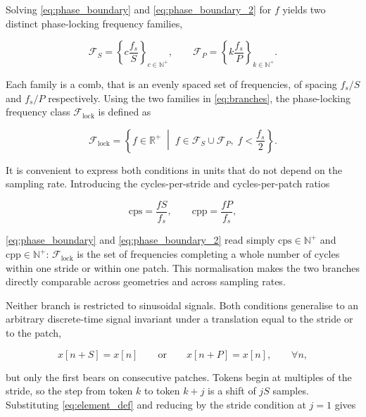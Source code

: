 Solving \autoref{eq:phase_boundary} and \autoref{eq:phase_boundary_2} for $f$ yields two distinct phase-locking frequency families,

\begin{equation}
\label{eq:branches}
\mathcal{F}_{S}
=
\left\{
c\frac{f_s}{S}
\right\}_{c\in\mathbb{N}^{+}},
\qquad
\mathcal{F}_{P}
=
\left\{
k\frac{f_s}{P}
\right\}_{k\in\mathbb{N}^{+}}.
\end{equation}

Each family is a comb, that is an evenly spaced set of frequencies, of spacing $f_s/S$ and $f_s/P$ respectively. Using the two families in \autoref{eq:branches}, the phase-locking frequency class $\mathcal{F}_{\mathrm{lock}}$ is defined as

\begin{equation}
\label{eq:flock_set}
\mathcal F_{\mathrm{lock}}
=
\left\{
f\in\mathbb{R}^{+}
\;\middle|\;
f\in\mathcal{F}_{S}\cup\mathcal{F}_{P},
\;
f<\frac{f_s}{2}
\right\}.
\end{equation}

It is convenient to express both conditions in units that do not depend on the sampling rate. Introducing the cycles-per-stride and cycles-per-patch ratios

\begin{equation}
\label{eq:cpp}
\mathrm{cps}
=
\frac{f S}{f_s},
\qquad
\mathrm{cpp}
=
\frac{f P}{f_s},
\end{equation}

\autoref{eq:phase_boundary} and \autoref{eq:phase_boundary_2} read simply $\mathrm{cps}\in\mathbb{N}^{+}$ and $\mathrm{cpp}\in\mathbb{N}^{+}$: $\mathcal{F}_{\mathrm{lock}}$ is the set of frequencies completing a whole number of cycles within one stride or within one patch. This normalisation makes the two branches directly comparable across geometries and across sampling rates.

Neither branch is restricted to sinusoidal signals. Both conditions generalise to an arbitrary discrete-time signal invariant under a translation equal to the stride or to the patch,

\begin{equation}
\label{eq:general_periodicity}
x[n+S]
=
x[n]
\qquad\text{or}\qquad
x[n+P]
=
x[n],
\qquad
\forall n,
\end{equation}

but only the first bears on consecutive patches. Tokens begin at multiples of the stride, so the step from token $k$ to token $k+j$ is a shift of $jS$ samples. Substituting \autoref{eq:element_def} and reducing by the stride condition at $j=1$ gives

